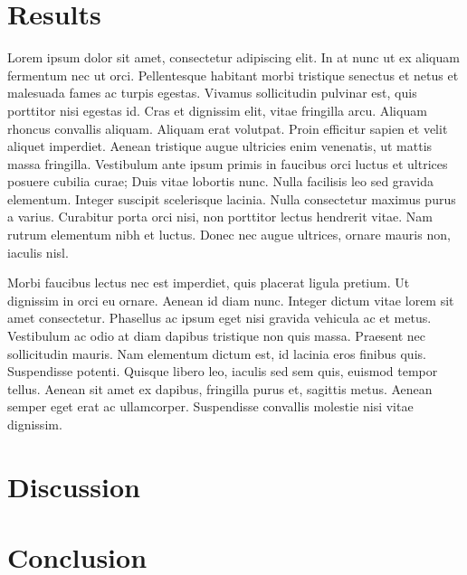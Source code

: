 \chapter{Results}

Lorem ipsum dolor sit amet, consectetur adipiscing elit. In at nunc ut ex aliquam fermentum nec ut orci. Pellentesque habitant morbi tristique senectus et netus et malesuada fames ac turpis egestas. Vivamus sollicitudin pulvinar est, quis porttitor nisi egestas id. Cras et dignissim elit, vitae fringilla arcu. Aliquam rhoncus convallis aliquam. Aliquam erat volutpat. Proin efficitur sapien et velit aliquet imperdiet. Aenean tristique augue ultricies enim venenatis, ut mattis massa fringilla. Vestibulum ante ipsum primis in faucibus orci luctus et ultrices posuere cubilia curae; Duis vitae lobortis nunc. Nulla facilisis leo sed gravida elementum. Integer suscipit scelerisque lacinia. Nulla consectetur maximus purus a varius. Curabitur porta orci nisi, non porttitor lectus hendrerit vitae. Nam rutrum elementum nibh et luctus. Donec nec augue ultrices, ornare mauris non, iaculis nisl.

Morbi faucibus lectus nec est imperdiet, quis placerat ligula pretium. Ut dignissim in orci eu ornare. Aenean id diam nunc. Integer dictum vitae lorem sit amet consectetur. Phasellus ac ipsum eget nisi gravida vehicula ac et metus. Vestibulum ac odio at diam dapibus tristique non quis massa. Praesent nec sollicitudin mauris. Nam elementum dictum est, id lacinia eros finibus quis. Suspendisse potenti. Quisque libero leo, iaculis sed sem quis, euismod tempor tellus. Aenean sit amet ex dapibus, fringilla purus et, sagittis metus. Aenean semper eget erat ac ullamcorper. Suspendisse convallis molestie nisi vitae dignissim.



\chapter{Discussion}

\chapter{Conclusion}
\label{sec:conclusion}

